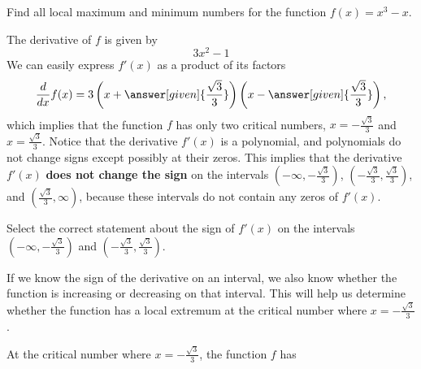 \documentclass{ximera}
\begin{document}
\begin{example}
Find all local maximum and minimum numbers for the function 
$f(x)=x^3-x$. 
\begin{explanation} 
The derivative of $f$ is given by
\[
3x^2 - 1
\] 
We can easily express  $f'(x)$ as a product of its factors
\[
\frac{d}{dx}
f(x)=3\left(x+\answer[given]{\frac{\sqrt{3}}{3}}\right)\left(x-\answer[given]{\frac{\sqrt{3}}{3}}\right),
\] 
which implies that the function $f$ has only two critical numbers,
$x=-\frac{\sqrt{3}}{3}$ and $x=\frac{\sqrt{3}}{3}$. Notice that the
derivative $f'(x)$ is a polynomial, and polynomials do not change
signs except possibly at their zeros. This implies that the derivative
$f'(x)$ \textbf{does not change the sign} on the intervals
$\left(-\infty,-\frac{\sqrt{3}}{3}\right)$,
$\left(-\frac{\sqrt{3}}{3},\frac{\sqrt{3}}{3}\right)$, and
$\left(\frac{\sqrt{3}}{3},\infty\right)$, because these intervals do not contain
any zeros of $f'(x)$.
 
\begin{question}
Select the correct statement about the sign of $f'(x)$ on the
intervals $\left(-\infty,-\frac{\sqrt{3}}{3}\right)$ and
$\left(-\frac{\sqrt{3}}{3},\frac{\sqrt{3}}{3}\right)$. 
\begin{multipleChoice}
\end{multipleChoice}
  \end{question}
  If we know the sign of the derivative on an interval, we also know whether the function is increasing or decreasing on that interval. This will help us determine whether the function has a local extremum at the critical number  where $x=-\frac{\sqrt{3}}{3}$. \\
  \begin{question}

At the critical number where $x=-\frac{\sqrt{3}}{3}$, the function $f$ has  \\
 

\end{question}
\end{explanation}
\end{example}
\end{document}
